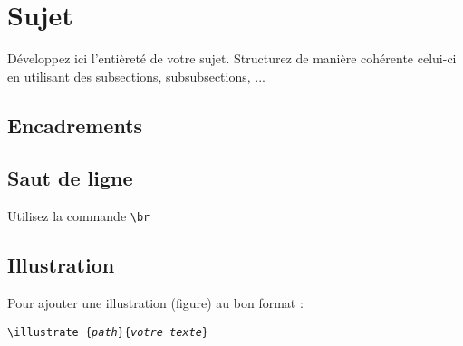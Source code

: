 \section{Sujet}
Développez ici l'entièreté de votre sujet.
Structurez de manière cohérente celui-ci en utilisant des subsections, subsubsections, ...

\subsection{Encadrements}



\subsection{Saut de ligne}

Utilisez la commande \texttt{\textbackslash br}

\subsection{Illustration}

Pour ajouter une illustration (figure) au bon format :

\texttt{\textbackslash illustrate \{\textit{path}\}\{\textit{votre texte}\}}

